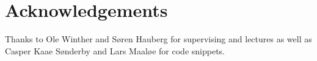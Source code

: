 \section{Acknowledgements}
\label{sec:acknowledgements}

Thanks to Ole Winther and Søren Hauberg for supervising and lectures as well as Casper Kaae Sønderby and Lars Maaløe for code snippets.
